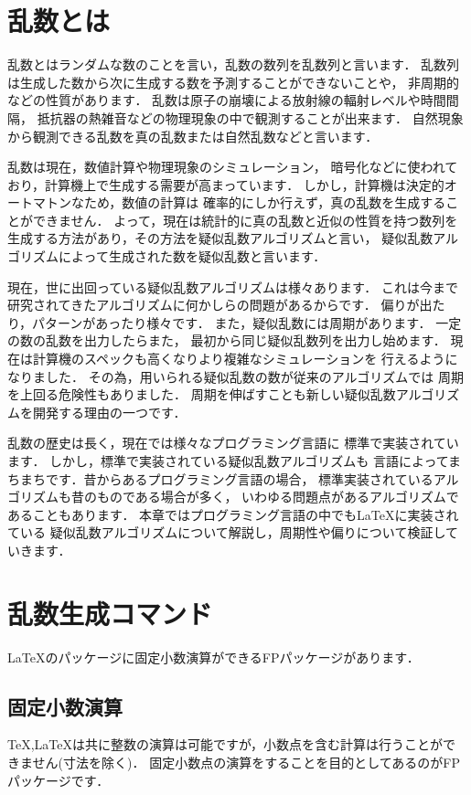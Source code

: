 \section{乱数とは}
乱数とはランダムな数のことを言い，乱数の数列を乱数列と言います．
乱数列は生成した数から次に生成する数を予測することができないことや，
非周期的などの性質があります．
乱数は原子の崩壊による放射線の輻射レベルや時間間隔，
抵抗器の熱雑音などの物理現象の中で観測することが出来ます．
自然現象から観測できる乱数を真の乱数または自然乱数などと言います．

乱数は現在，数値計算や物理現象のシミュレーション，
暗号化などに使われており，計算機上で生成する需要が高まっています．
しかし，計算機は決定的オートマトンなため，数値の計算は
確率的にしか行えず，真の乱数を生成することができません．
よって，現在は統計的に真の乱数と近似の性質を持つ数列を
生成する方法があり，その方法を疑似乱数アルゴリズムと言い，
疑似乱数アルゴリズムによって生成された数を疑似乱数と言います．

現在，世に出回っている疑似乱数アルゴリズムは様々あります．
これは今まで研究されてきたアルゴリズムに何かしらの問題があるからです．
偏りが出たり，パターンがあったり様々です．
また，疑似乱数には周期があります．
一定の数の乱数を出力したらまた，
最初から同じ疑似乱数列を出力し始めます．
現在は計算機のスペックも高くなりより複雑なシミュレーションを
行えるようになりました．
その為，用いられる疑似乱数の数が従来のアルゴリズムでは
周期を上回る危険性もありました．
周期を伸ばすことも新しい疑似乱数アルゴリズムを開発する理由の一つです．

乱数の歴史は長く，現在では様々なプログラミング言語に
標準で実装されています．
しかし，標準で実装されている疑似乱数アルゴリズムも
言語によってまちまちです．昔からあるプログラミング言語の場合，
標準実装されているアルゴリズムも昔のものである場合が多く，
いわゆる問題点があるアルゴリズムであることもあります．
本章ではプログラミング言語の中でも\LaTeX に実装されている
疑似乱数アルゴリズムについて解説し，周期性や偏りについて検証していきます．
\section{乱数生成コマンド}
\LaTeX のパッケージに固定小数演算ができるFPパッケージがあります．
\subsection{固定小数演算}
\TeX ,\LaTeX は共に整数の演算は可能ですが，小数点を含む計算は行うことができません(寸法を除く)．
固定小数点の演算をすることを目的としてあるのがFPパッケージです．
